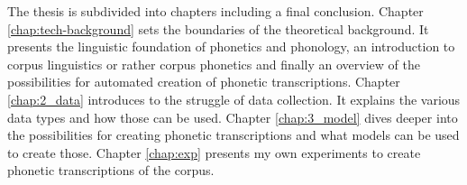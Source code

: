 The thesis is subdivided into  chapters including a final conclusion. Chapter \ref{chap:tech-background} sets the boundaries of the theoretical background. It presents the linguistic foundation of phonetics and phonology, an introduction to corpus linguistics or rather corpus phonetics and finally an overview of the possibilities for automated creation of phonetic transcriptions. Chapter \ref{chap:2_data} introduces to the struggle of data collection. It explains the various data types and how those can be used. Chapter \ref{chap:3_model} dives deeper into the possibilities for creating phonetic transcriptions and what models can be used to create those. Chapter \ref{chap:exp} presents my own experiments to create phonetic transcriptions of the corpus.


